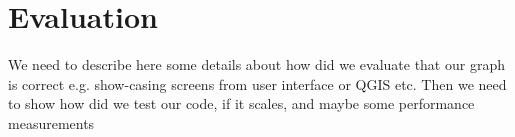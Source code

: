 \chapter{Evaluation}
\label{cha:evaluation}

We need to describe here some details about how did we evaluate that our graph is correct e.g. show-casing screens from user interface or QGIS etc. Then we need to show how did we test our code, if it scales, and maybe some performance measurements